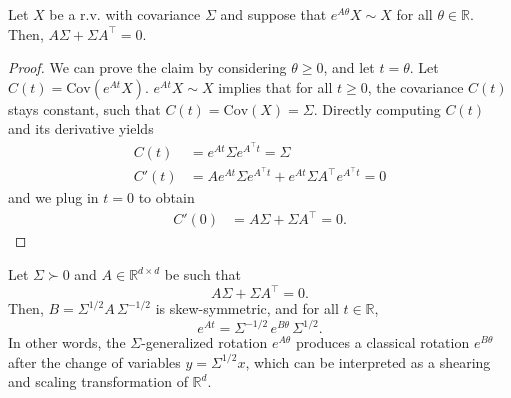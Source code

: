 \documentclass[twoside,11pt]{article}
\newcommand{\R} {\mathbb R}
\newcommand{\cov} {\mathrm{Cov}}
\begin{document}
\begin{lemma}
Let $X$ be a r.v. with covariance $\Sigma$ and suppose that $e^{A\theta}X \sim X$ for all $\theta \in \R$. 
Then, $A\Sigma + \Sigma A^\top  = 0$. 
\label{lem: lyapunov_condition}
\end{lemma}
\begin{proof}
We can prove the claim by considering $\theta \ge 0$, and let $t=\theta$. Let $C(t) = \cov(e^{At}X)$. $e^{At}X \sim X$ implies that for all $t \ge 0$, the covariance $C(t)$ stays constant, such that $C(t)= \cov(X) = \Sigma$. Directly computing $C(t)$ and its derivative yields
\begin{align*}
C(t) &= e^{At}\Sigma e^{A^\top t} = \Sigma\\
C'(t) &=  Ae^{At}\Sigma e^{A^\top t} + e^{At}\Sigma A^\top e^{A^\top t} = 0
\end{align*}
and we plug in $t=0$ to obtain
\begin{align*}
C'(0) &= A\Sigma + \Sigma A^\top   = 0.
\end{align*}
\end{proof}


\begin{lemma}
Let \(\Sigma \succ 0\) and \(A \in \R^{d \times d}\) be such that
\[
A\Sigma + \Sigma A^\top  = 0.
\]
Then, $B = \Sigma^{1/2} A\,\Sigma^{-1/2}$  is skew-symmetric, and for all \(t\in\R\),
\[
e^{At} = \Sigma^{-1/2}\,e^{B\theta}\,\Sigma^{1/2}.
\]
In other words, the $\Sigma$-generalized rotation \(e^{A\theta}\) produces a classical rotation \(e^{B\theta}\) after the change of variables \(y = \Sigma^{1/2}x\), which can be interpreted as a shearing and scaling transformation of $\R^d$.
\label{lem:conjugate_rotation}
\end{lemma}
\end{document}
